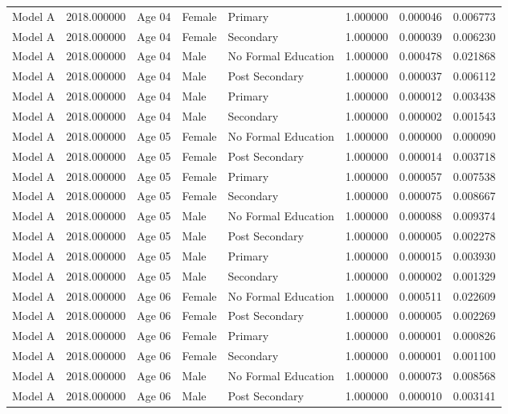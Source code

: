 \begin{table}[ht]
\begin{tabular}{lrlllrrr}
Model A & 2018.000000 & Age 04 & Female & Primary & 1.000000 & 0.000046 & 0.006773 \\
Model A & 2018.000000 & Age 04 & Female & Secondary & 1.000000 & 0.000039 & 0.006230 \\
Model A & 2018.000000 & Age 04 & Male & No Formal Education & 1.000000 & 0.000478 & 0.021868 \\
Model A & 2018.000000 & Age 04 & Male & Post Secondary & 1.000000 & 0.000037 & 0.006112 \\
Model A & 2018.000000 & Age 04 & Male & Primary & 1.000000 & 0.000012 & 0.003438 \\
Model A & 2018.000000 & Age 04 & Male & Secondary & 1.000000 & 0.000002 & 0.001543 \\
Model A & 2018.000000 & Age 05 & Female & No Formal Education & 1.000000 & 0.000000 & 0.000090 \\
Model A & 2018.000000 & Age 05 & Female & Post Secondary & 1.000000 & 0.000014 & 0.003718 \\
Model A & 2018.000000 & Age 05 & Female & Primary & 1.000000 & 0.000057 & 0.007538 \\
Model A & 2018.000000 & Age 05 & Female & Secondary & 1.000000 & 0.000075 & 0.008667 \\
Model A & 2018.000000 & Age 05 & Male & No Formal Education & 1.000000 & 0.000088 & 0.009374 \\
Model A & 2018.000000 & Age 05 & Male & Post Secondary & 1.000000 & 0.000005 & 0.002278 \\
Model A & 2018.000000 & Age 05 & Male & Primary & 1.000000 & 0.000015 & 0.003930 \\
Model A & 2018.000000 & Age 05 & Male & Secondary & 1.000000 & 0.000002 & 0.001329 \\
Model A & 2018.000000 & Age 06 & Female & No Formal Education & 1.000000 & 0.000511 & 0.022609 \\
Model A & 2018.000000 & Age 06 & Female & Post Secondary & 1.000000 & 0.000005 & 0.002269 \\
Model A & 2018.000000 & Age 06 & Female & Primary & 1.000000 & 0.000001 & 0.000826 \\
Model A & 2018.000000 & Age 06 & Female & Secondary & 1.000000 & 0.000001 & 0.001100 \\
Model A & 2018.000000 & Age 06 & Male & No Formal Education & 1.000000 & 0.000073 & 0.008568 \\
Model A & 2018.000000 & Age 06 & Male & Post Secondary & 1.000000 & 0.000010 & 0.003141 \\

\end{tabular}
\end{table}
